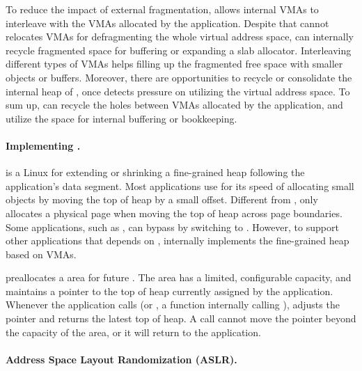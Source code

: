 To reduce the impact of external fragmentation, \thelibos{} allows internal VMAs to interleave with the VMAs allocated by the application.
Despite that \thelibos{} cannot relocates VMAs
for defragmenting the whole virtual address space,
\thelibos{} can internally recycle fragmented space for buffering or expanding a slab allocator.
Interleaving different types of VMAs
helps filling up the fragmented free space
with smaller objects or buffers.
Moreover, there are opportunities to recycle or consolidate the internal heap of \thelibos{},
once \thelibos{} detects pressure on utilizing the virtual address space.
To sum up, \thelibos{} can recycle the holes between VMAs allocated by the application, and utilize the space for internal buffering or bookkeeping.








\paragraph{Implementing .}


 is a Linux \linuxapi{} for extending or shrinking a fine-grained heap following the application's data segment.
Most applications 
use  
for its speed of allocating 
small objects by moving the top of heap by a small offset.
Different from ,
 only allocates a physical page
when moving the top of heap across page boundaries.
Some applications, such as \gcc{}, can bypass  by switching to .
However, to support other applications that depends on ,
\thelibos{} internally implements the fine-grained heap
based on VMAs.



\thelibos{} preallocates a  area for future  \linuxapis{}.
The  area has a limited, configurable capacity,
and maintains a  pointer to the top of heap currently assigned by the application.
Whenever the application calls  (or , a \libc{} function internally calling ),
\thelibos{} adjusts the  pointer
and returns the latest top of heap.
A  call cannot move the  pointer beyond the capacity of the  area,
or it will return  to the application.


\paragraph{Address Space Layout Randomization (ASLR).}

